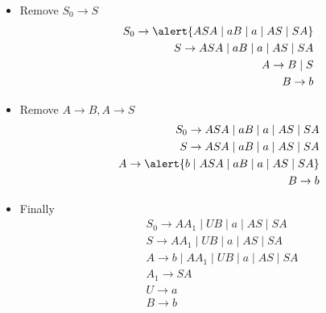 \begin{frame}[allowframebreaks]
\begin{itemize}
\item Remove $S_0 \rightarrow S$
  \begin{eqnarray*}
&& S_0 \rightarrow \alert{ASA\mid aB\mid a \mid AS\mid SA}\\
&& S \rightarrow ASA\mid aB\mid a \mid AS \mid SA\\
&& A \rightarrow B\mid S\\
&& B \rightarrow b
\end{eqnarray*}

\item Remove $A\rightarrow B, A\rightarrow S$
  \begin{eqnarray*}
&& S_0 \rightarrow ASA\mid aB\mid a \mid AS\mid SA\\
&& S \rightarrow ASA\mid aB\mid a \mid AS \mid SA\\
&& A \rightarrow \alert{b \mid ASA \mid aB\mid a \mid AS \mid SA}\\
&& B \rightarrow b
\end{eqnarray*}
\item Finally
\begin{eqnarray*}
&& S_0 \rightarrow AA_1\mid UB\mid a \mid AS\mid SA\\
&& S \rightarrow AA_1 \mid UB\mid  a \mid AS \mid SA\\
&& A \rightarrow b \mid AA_1 \mid UB\mid a \mid AS \mid SA\\
&& A_1 \rightarrow SA\\
&& U \rightarrow a\\
&& B \rightarrow b\\
  \end{eqnarray*}

\end{itemize}\end{frame}


